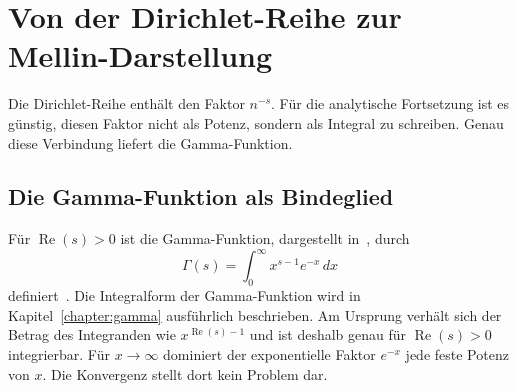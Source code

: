 %
%
%
%

\section{Von der Dirichlet-Reihe zur Mellin-Darstellung
\label{hankel:section:mellin}}

Die Dirichlet-Reihe enthält den Faktor $n^{-s}$. 
Für die analytische Fortsetzung ist es günstig, diesen Faktor nicht als Potenz, sondern als Integral zu schreiben. 
Genau diese Verbindung liefert die Gamma-Funktion.

\subsection{Die Gamma-Funktion als Bindeglied}

Für $\operatorname{Re}(s)>0$ ist die Gamma-Funktion, dargestellt in~, durch
%
\begin{equation}
\Gamma(s)
=
\int_0^\infty
x^{s-1}e^{-x}
\,dx
\label{hankel:eq:gamma-definition}
\end{equation}
definiert~\cite{hankel:dlmf}. 
Die Integralform der Gamma-Funktion wird in Kapitel~\ref{chapter:gamma} ausführlich beschrieben.
Am Ursprung verhält sich der Betrag des Integranden wie
$x^{\operatorname{Re}(s)-1}$ und ist deshalb genau für
$\operatorname{Re}(s)>0$ integrierbar. 
Für $x\to\infty$ dominiert der exponentielle Faktor $e^{-x}$ jede feste Potenz von $x$.
Die Konvergenz stellt dort kein Problem dar.

